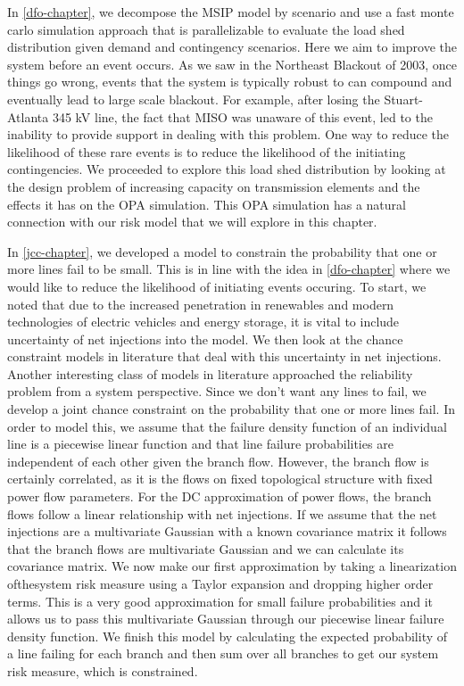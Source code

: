 In \cref{dfo-chapter}, we decompose the MSIP model by scenario and use a fast monte carlo simulation approach that is parallelizable to evaluate the load shed distribution given demand and contingency scenarios.  Here we aim to improve the system before an event occurs.  As we saw in the Northeast Blackout of 2003, once things go wrong, events that the system is typically robust to can compound and eventually lead to large scale blackout.  For example, after losing the Stuart-Atlanta 345 kV line, the fact that MISO was unaware of this event, led to the inability to provide support in dealing with this problem.  One way to reduce the likelihood of these rare events is to reduce the likelihood of the initiating contingencies.  We proceeded to explore this load shed distribution by looking at the design problem of increasing capacity on transmission elements and the effects it has on the OPA simulation.  This OPA simulation has a natural connection with our risk model that we will explore in this chapter.

In \cref{jcc-chapter}, we developed a model to constrain the probability that one or more lines fail to be small.  This is in line with the idea in \cref{dfo-chapter} where we would like to reduce the likelihood of initiating events occuring.  To start, we noted that due to the increased penetration in renewables and modern technologies of electric vehicles and energy storage, it is vital to include uncertainty of net injections into the model.  We then look at the chance constraint models in literature that deal with this uncertainty in net injections.  Another interesting class of models in literature approached the reliability problem from a system perspective.  Since we don't want any lines to fail, we develop a joint chance constraint on the probability that one or more lines fail.  In order to model this, we assume that the failure density function of an individual line is a piecewise linear function and that line failure probabilities are independent of each other given the branch flow.  However, the branch flow is certainly correlated, as it is the flows on fixed topological structure with fixed power flow parameters.  For the DC approximation of power flows, the branch flows follow a linear relationship with net injections.  If we assume that the net injections are a multivariate Gaussian with a known covariance matrix it follows that the branch flows are multivariate Gaussian and we can calculate its covariance matrix.  We now make our first approximation by taking a linearization ofthesystem risk measure using a Taylor expansion and dropping higher order terms.  This is a very good approximation for small failure probabilities and it allows us to pass this multivariate Gaussian through our piecewise linear failure density function.  We finish this model by calculating the expected probability of a line failing for each branch and then sum over all branches to get our system risk measure, which is constrained.


